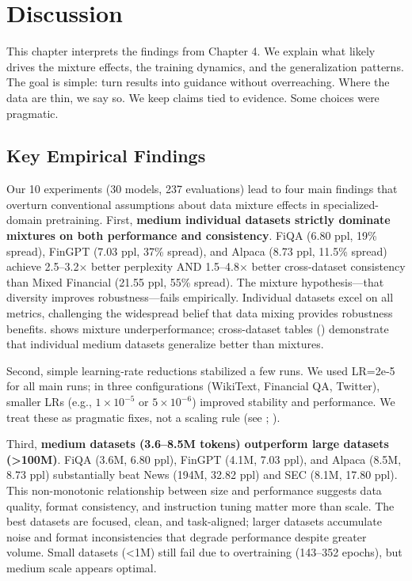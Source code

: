 \chapter{Discussion}

This chapter interprets the findings from Chapter 4. We explain what likely drives the mixture effects, the training dynamics, and the generalization patterns. The goal is simple: turn results into guidance without overreaching. Where the data are thin, we say so. We keep claims tied to evidence. Some choices were pragmatic.

\section{Key Empirical Findings}

Our 10 experiments (30 models, 237 evaluations) lead to four main findings that overturn conventional assumptions about data mixture effects in specialized-domain pretraining. First, \textbf{medium individual datasets strictly dominate mixtures on both performance and consistency}. FiQA (6.80 ppl, 19\% spread), FinGPT (7.03 ppl, 37\% spread), and Alpaca (8.73 ppl, 11.5\% spread) achieve 2.5–3.2$\times$ better perplexity AND 1.5–4.8$\times$ better cross-dataset consistency than Mixed Financial (21.55 ppl, 55\% spread). The mixture hypothesis—that diversity improves robustness—fails empirically. Individual datasets excel on all metrics, challenging the widespread belief that data mixing provides robustness benefits.  shows mixture underperformance; cross-dataset tables () demonstrate that individual medium datasets generalize better than mixtures.

Second, simple learning‑rate reductions stabilized a few runs. We used LR=2e‑5 for all main runs; in three configurations (WikiText, Financial QA, Twitter), smaller LRs (e.g., $1\times10^{-5}$ or $5\times10^{-6}$) improved stability and performance. We treat these as pragmatic fixes, not a scaling rule (see ; ).

Third, \textbf{medium datasets (3.6–8.5M tokens) outperform large datasets (>100M)}. FiQA (3.6M, 6.80 ppl), FinGPT (4.1M, 7.03 ppl), and Alpaca (8.5M, 8.73 ppl) substantially beat News (194M, 32.82 ppl) and SEC (8.1M, 17.80 ppl). This non-monotonic relationship between size and performance suggests data quality, format consistency, and instruction tuning matter more than scale. The best datasets are focused, clean, and task-aligned; larger datasets accumulate noise and format inconsistencies that degrade performance despite greater volume. Small datasets (<1M) still fail due to overtraining (143–352 epochs), but medium scale appears optimal.

